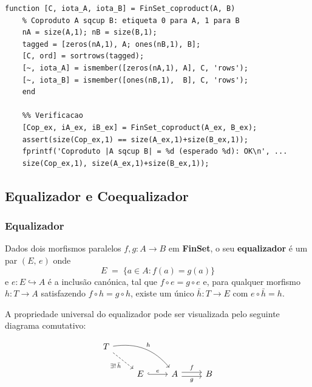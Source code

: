 \begin{lstlisting}[style=matlab, caption={Coproduto e Injeções Canónicas em FinSet}]
	function [C, iota_A, iota_B] = FinSet_coproduct(A, B)
	% Coproduto A sqcup B: etiqueta 0 para A, 1 para B
	nA = size(A,1); nB = size(B,1);
	tagged = [zeros(nA,1), A; ones(nB,1), B];
	[C, ord] = sortrows(tagged);
	[~, iota_A] = ismember([zeros(nA,1), A], C, 'rows');
	[~, iota_B] = ismember([ones(nB,1),  B], C, 'rows');
	end
	
	%% Verificacao
	[Cop_ex, iA_ex, iB_ex] = FinSet_coproduct(A_ex, B_ex);
	assert(size(Cop_ex,1) == size(A_ex,1)+size(B_ex,1));
	fprintf('Coproduto |A sqcup B| = %d (esperado %d): OK\n', ...
	size(Cop_ex,1), size(A_ex,1)+size(B_ex,1));
\end{lstlisting}

\subsection{Equalizador e Coequalizador}
\label{subsec:eq_coeq}

\subsubsection{Equalizador}

\begin{definition}
	Dados dois morfismos paralelos $f, g : A \to B$ em \textbf{FinSet},
	o seu \textbf{equalizador} é um par $(E,\, e)$ onde
	\begin{equation}
		E \;=\; \{a \in A : f(a) = g(a)\}
		\label{eq:equalizer_set}
	\end{equation}
	e $e : E \hookrightarrow A$ é a inclusão canónica, tal que
	$f \circ e = g \circ e$ e, para qualquer morfismo
	$h : T \to A$ satisfazendo $f \circ h = g \circ h$,
	existe um único $\bar{h} : T \to E$ com $e \circ \bar{h} = h$.
\end{definition}

A propriedade universal do equalizador pode ser visualizada pelo
seguinte diagrama comutativo:

\[
\begin{tikzcd}
	T \arrow[drr, "h", bend left] \arrow[dr, dashed, "\exists!\,\bar{h}", swap] & & \\
	& E \arrow[r, hook, "e"] & A \arrow[r, shift left, "f"] \arrow[r, shift right, "g", swap] & B
\end{tikzcd}
\]

